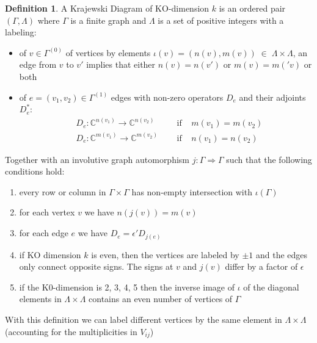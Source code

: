 \documentclass[a4paper]{article}
\theoremstyle{definition}
\newtheorem{definition}{Definition}
\theoremstyle{definition}
\theoremstyle{definition}
\theoremstyle{theorem}
\theoremstyle{theorem}
\theoremstyle{theorem}
\begin{document}
\begin{definition}
    A Krajewski Diagram of KO-dimension $k$ is an ordered pair $(\Gamma,
    \Lambda)$ where $\Gamma$ is a finite graph and $\Lambda$ is a set of
    positive integers with a labeling:

    \begin{itemize}
        \item of $v \in \Gamma^{(0)}$ of vertices by elements $\iota (v) =
            (n(v), m(v))\; \in \; \Lambda \times \Lambda$, an edge from $v$ to
            $v'$ implies that either $n(v) = n(v')$ or $m(v) = m('v)$ or both
        \item of $e = (v_1, v_2) \in \Gamma^{(1)}$ edges with non-zero
            operators $D_e$ and their adjoints $D_e^*$:
            \begin{align*}
                &D_e:\mathbb{C}^{n(v_1)} \rightarrow
                \mathbb{C}^{n(v_2)}\;\;\;\;\; &\text{if} \;\;\;\; m(v_1) = m(v_2)\\
                &D_e:\mathbb{C}^{m(v_1)} \rightarrow
                \mathbb{C}^{m(v_2)}\;\;\;\;\; &\text{if} \;\;\;\; n(v_1) = n(v_2)
            \end{align*}
    \end{itemize}
    Together with an involutive graph automorphism $j:\Gamma \Rightarrow
    \Gamma$ such that the following conditions hold:
    \begin{enumerate}
        \item every row or column in $\Gamma \times \Gamma$ has non-empty
            intersection with $\iota(\Gamma)$
        \item for each vertex $v$ we have $n(j(v)) = m(v)$
        \item for each edge $e$ we have $D_e = \epsilon' D_{j(e)}$
        \item if KO dimension $k$ is even, then the vertices are labeled by
            $\pm 1$ and the edges only connect opposite signs. The signs at $v$
            and $j(v)$ differ by a factor of $\epsilon$
        \item if the K0-dimension is 2, 3, 4, 5 then the inverse image of
            $\iota$ of the diagonal elements in $\Lambda \times \Lambda$
            contains an even number of vertices of $\Gamma$
    \end{enumerate}
\end{definition}
With this definition we can label different vertices by the same element in
$\Lambda \times \Lambda$ (accounting for the multiplicities in $V_{ij}$)
\newline
\end{document}
